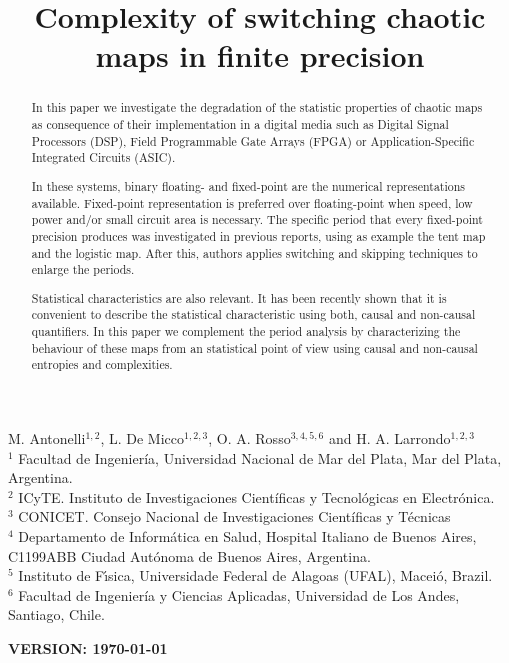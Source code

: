 \begin{frontmatter}

	\title{Complexity of switching chaotic maps in finite precision}
	M. Antonelli$^{1,2}$, L. De Micco$^{1,2,3}$, O. A. Rosso$^{3,4,5,6}$ and H. A. Larrondo$^{1,2,3}$\\
	$^{1}$ Facultad de Ingenier\'ia, Universidad Nacional de Mar del Plata, Mar del Plata, Argentina.\\
	$^{2}$ ICyTE. Instituto de Investigaciones Científicas y Tecnológicas en Electrónica.\\
	$^{3}$ CONICET. Consejo Nacional de Investigaciones Científicas y Técnicas\\
	$^{4}$ Departamento de Inform\'atica en Salud, Hospital Italiano de Buenos Aires, C1199ABB Ciudad Autónoma de Buenos Aires, Argentina.\\
	$^{5}$ Instituto de F\'{\i}sica, Universidade Federal de Alagoas (UFAL), Macei\'o, Brazil.\\
	$^{6}$ Facultad de Ingeniería y Ciencias Aplicadas, Universidad de Los Andes, Santiago, Chile.
	

\begin{abstract}

In this paper we investigate the degradation of the statistic properties of chaotic maps as consequence of their implementation in a digital media such as Digital Signal Processors (DSP), Field Programmable Gate Arrays (FPGA) or Application-Specific Integrated Circuits (ASIC).

In these systems, binary floating- and fixed-point are the numerical representations available.
Fixed-point representation is preferred over floating-point when speed, low power and/or small circuit area is necessary.
The specific period that every fixed-point precision produces was investigated in previous reports, using as example the tent map and the logistic map.
After this, authors applies switching and skipping techniques to enlarge the periods.

Statistical characteristics are also relevant.
It has been recently shown that it is convenient to describe the statistical characteristic using both, causal and non-causal quantifiers.
In this paper we complement the period analysis by characterizing the behaviour of these maps from an statistical point of view using causal and non-causal entropies and complexities.

\end{abstract}
\maketitle
\end{frontmatter}
{\bf VERSION: \today}